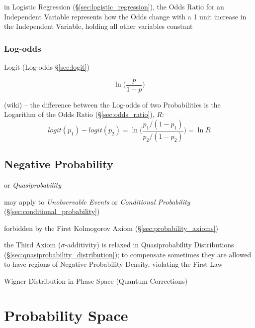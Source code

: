 in Logistic Regression (\S\ref{sec:logistic_regression}), the Odds Ratio for an
Independent Variable represents how the Odds change with a 1 unit increase in
the Independent Variable, holding all other variables constant



\subsubsection{Log-odds}\label{sec:log_odds}

Logit (Log-odds \S\ref{sec:logit})

\[
  \ln \Big(\frac{p}{1 - p}\Big)
\]

(wiki) --
the difference between the Log-odds of two Probabilities is the Logarithm
of the Odds Ratio (\S\ref{sec:odds_ratio}), $R$:
\[
  logit(p_1) - logit(p_2) = \ln\Big(\frac{p_1/(1 - p_1)}{p_2/(1 - p_2)}\Big)
    = \ln R
\]



\subsection{Negative Probability}\label{sec:negative_probability}

or \emph{Quasiprobability}

may apply to \emph{Unobservable Events} or \emph{Conditional Probability}
(\S\ref{sec:conditional_probability})

forbidden by the First Kolmogorov Axiom (\S\ref{sec:probability_axioms})

the Third Axiom ($\sigma$-additivity) is relaxed in Quasiprobability
Distributions (\S\ref{sec:quasiprobability_distribution}); to compensate
sometimes they are allowed to have regions of Negative Probability Density,
violating the First Law

Wigner Distribution in Phase Space (Quantum Corrections)



\section{Probability Space}\label{sec:probability_space}

